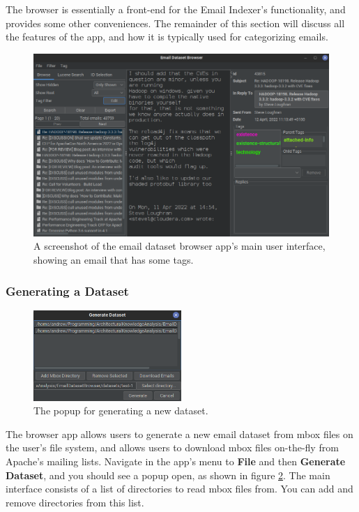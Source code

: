 \documentclass[a4paper, 12pt]{article}
\begin{document}
		The browser is essentially a front-end for the Email Indexer's functionality, and provides some other conveniences. The remainder of this section will discuss all the features of the app, and how it is typically used for categorizing emails.
	
		\begin{figure}[H]
			\centering
			\includegraphics[width=\textwidth]{img/edb-app_populated.png}
			\caption{A screenshot of the email dataset browser app's main user interface, showing an email that has some tags.}
			\label{fig:edb-app-populated}
		\end{figure}
	
		\newpage
		\subsubsection{Generating a Dataset}
			\begin{figure}
				\includegraphics[width=0.5\textwidth]{img/edb-app_generate-dataset-popup.png}
				\caption{The popup for generating a new dataset.}
				\label{fig:edb-app-generate-dataset}
			\end{figure}
			The browser app allows users to generate a new email dataset from mbox files on the user's file system, and allows users to download mbox files on-the-fly from Apache's mailing lists. Navigate in the app's menu to \textbf{File} and then \textbf{Generate Dataset}, and you should see a popup open, as shown in figure \ref{fig:edb-app-generate-dataset}. The main interface consists of a list of directories to read mbox files from. You can add and remove directories from this list.
			
\end{document}
